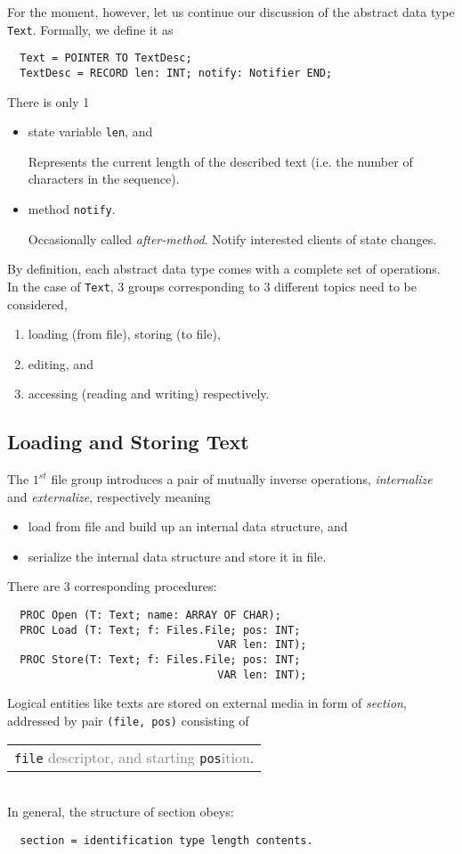 For the moment, however, let us continue our discussion of the abstract data type \verb|Text|.
Formally, we define it as
\begin{verbatim}
  Text = POINTER TO TextDesc;
  TextDesc = RECORD len: INT; notify: Notifier END;
\end{verbatim}
There is only 1
\begin{itemize}
  \item state variable \verb|len|, and

    Represents the current length of the described text
    (i.e. the number of characters in the sequence).
  \item method \verb|notify|.

    Occasionally called \emph{after-method}.
    Notify interested clients of state changes.
\end{itemize}

By definition, each abstract data type comes with a complete set of operations.
In the case of \verb|Text|, 3 groups corresponding to 3 different topics need to be considered,
\begin{enumerate}
  \item loading (from file),
        storing (to file),
  \item editing, and
  \item accessing (reading and writing) respectively.
\end{enumerate}

\subsection{Loading and Storing Text}
The $1^{st}$ file group introduces a pair of mutually inverse operations,
\emph{internalize} and \emph{externalize}, respectively meaning
\begin{itemize}
  \item load from file and build up an internal data structure, and
  \item serialize the internal data structure and store it in file.
\end{itemize}
There are 3 corresponding procedures:
\begin{verbatim}
  PROC Open (T: Text; name: ARRAY OF CHAR);
  PROC Load (T: Text; f: Files.File; pos: INT;
                                 VAR len: INT);
  PROC Store(T: Text; f: Files.File; pos: INT;
                                 VAR len: INT);
\end{verbatim}
Logical entities like texts are stored on external media in form of \emph{section},
addressed by pair \verb|(file, pos)| consisting of
\begin{table}[h!]
  \centering
  \begin{tabular}{l}
    \verb|file| \textcolor{gray}{descriptor, and
    starting} \verb|pos|\textcolor{gray}{ition}.
  \end{tabular}
\end{table}
\\In general, the structure of section obeys:
\begin{verbatim}
  section = identification type length contents.
\end{verbatim}

